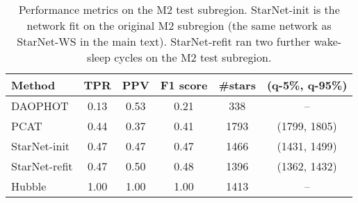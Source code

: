 \begin{table}[ht]
\centering
\caption{Performance metrics on the M2 test subregion. 
StarNet-init is the network fit on the original M2 subregion (the same network as StarNet-WS in the main text). 
StarNet-refit ran two further wake-sleep cycles on the M2 test subregion. }
\label{tab:summary_stats_m2test}
\begin{tabular}{l|ccc|cc}
\toprule
     Method &   TPR &   PPV &  F1 score &  \#stars & (q-5\%, q-95\%)\\
\midrule
    DAOPHOT &  0.13 &  0.53 &      0.21 &     338 & -- \\
       PCAT &  0.44 &  0.37 &      0.41 &    1793 & (1799, 1805)\\
 StarNet-init &  0.47 &  0.47 &      0.47 &    1466 & (1431, 1499)\\
 StarNet-refit &  0.47 &  0.50 &      0.48 &     1396 & (1362, 1432)\\
     Hubble &  1.00 &  1.00 &      1.00 &     1413 & -- \\
\bottomrule
\end{tabular}
\end{table}

